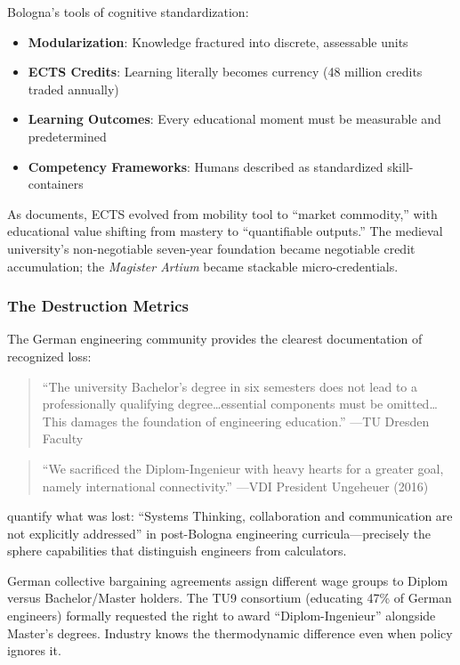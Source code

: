 Bologna's tools of cognitive standardization:

\begin{itemize}
    \item \textbf{Modularization}: Knowledge fractured into discrete, assessable units
    \item \textbf{ECTS Credits}: Learning literally becomes currency (48 million credits traded annually)
    \item \textbf{Learning Outcomes}: Every educational moment must be measurable and predetermined
    \item \textbf{Competency Frameworks}: Humans described as standardized skill-containers
\end{itemize}

As \citet{gleeson2021} documents, ECTS evolved from mobility tool to ``market commodity,'' with educational value shifting from mastery to ``quantifiable outputs.'' The medieval university's non-negotiable seven-year foundation became negotiable credit accumulation; the \textit{Magister Artium} became stackable micro-credentials.

\subsubsection{The Destruction Metrics}

The German engineering community provides the clearest documentation of recognized loss:

\begin{quote}
``The university Bachelor's degree in six semesters does not lead to a professionally qualifying degree\ldots essential components must be omitted\ldots This damages the foundation of engineering education.'' ---TU Dresden Faculty \citep{odenbach2015}
\end{quote}

\begin{quote}
``We sacrificed the Diplom-Ingenieur with heavy hearts for a greater goal, namely international connectivity.'' ---VDI President Ungeheuer (2016)
\end{quote}

\citet{kaiser2022} quantify what was lost: ``Systems Thinking, collaboration and communication are not explicitly addressed'' in post-Bologna engineering curricula---precisely the sphere capabilities that distinguish engineers from calculators.

German collective bargaining agreements assign different wage groups to Diplom versus Bachelor/Master holders. The TU9 consortium (educating 47\% of German engineers) formally requested the right to award ``Diplom-Ingenieur'' alongside Master's degrees. Industry knows the thermodynamic difference even when policy ignores it.

